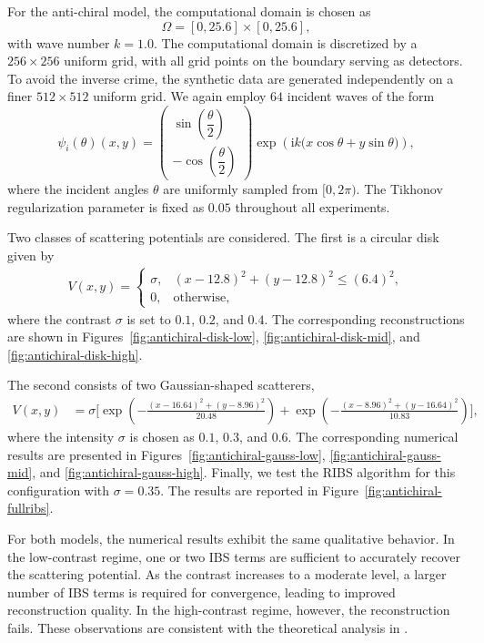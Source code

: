 \documentclass[12pt,reqno]{amsart}
\begin{document}
For the anti-chiral model, the computational domain is chosen as
\[
\Omega = [0,25.6]\times[0,25.6],
\]
with wave number \(k=1.0\).
The computational domain is discretized by a \(256\times256\) uniform grid, with all grid points on the boundary serving as detectors. To avoid the inverse crime, the synthetic data are generated independently on a finer \(512\times512\) uniform grid.
We again employ \(64\) incident waves of the form
\[
\psi_i(\theta)(x,y)
=
\begin{pmatrix}
\sin\!\left(\dfrac{\theta}{2}\right)\\[6pt]
-\cos\!\left(\dfrac{\theta}{2}\right)
\end{pmatrix}
\exp\!\left(\mathrm{i}k\big(x\cos\theta + y\sin\theta\big)\right),
\]
where the incident angles \(\theta\) are uniformly sampled from \([0,2\pi)\). The Tikhonov regularization parameter is fixed as \(0.05\) throughout all experiments.

Two classes of scattering potentials are considered.
The first is a circular disk given by
\begin{align*}
V(x,y)
=
\begin{cases}
\sigma, & (x-12.8)^2 + (y-12.8)^2 \le (6.4)^2,\\[6pt]
0, & \text{otherwise},
\end{cases}
\end{align*}
where the contrast  \(\sigma\) is set to \(0.1\), \(0.2\), and \(0.4\).
The corresponding reconstructions are shown in
Figures~\ref{fig:antichiral-disk-low}, \ref{fig:antichiral-disk-mid}, and \ref{fig:antichiral-disk-high}.

The second consists of two Gaussian-shaped scatterers,
\begin{align*}
V(x,y)
&=\sigma\Bigg[
\exp\!\left(
-\frac{(x-16.64)^2+(y-8.96)^2}{20.48}
\right)
+
\exp\!\left(
-\frac{(x-8.96)^2+(y-16.64)^2}{10.83}
\right)
\Bigg],
\end{align*}
where the intensity  \(\sigma\) is chosen as \(0.1\), \(0.3\), and \(0.6\).
The corresponding numerical results are presented in
Figures~\ref{fig:antichiral-gauss-low}, \ref{fig:antichiral-gauss-mid}, and \ref{fig:antichiral-gauss-high}.
Finally, we test the RIBS algorithm for this configuration with \(\sigma=0.35\).
The results are reported in Figure~\ref{fig:antichiral-fullribs}.

For both models, the numerical results exhibit the same qualitative behavior.
In the low-contrast regime, one or two IBS terms are sufficient to accurately recover the scattering potential.
As the contrast increases to a moderate level, a larger number of IBS terms is required for convergence, leading to improved reconstruction quality. 
In the high-contrast regime, however, the reconstruction fails.
These observations are consistent with the theoretical analysis in \cite{hoskinsAnalysisInverseBorn2022}.
\end{document}
